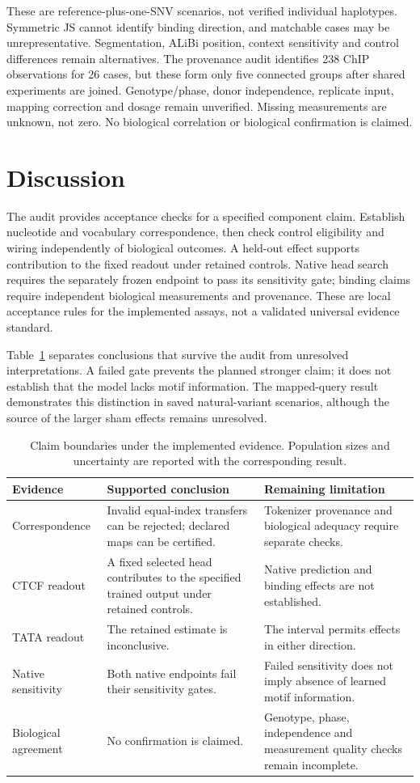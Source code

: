 \documentclass[unnumsec,webpdf,modern,large,namedate]{oup-authoring-template}
\begin{document}
These are reference-plus-one-SNV scenarios, not verified individual haplotypes. Symmetric JS cannot identify binding direction, and matchable cases may be unrepresentative. Segmentation, ALiBi position, context sensitivity and control differences remain alternatives. The provenance audit identifies 238 ChIP observations for 26 cases, but these form only five connected groups after shared experiments are joined. Genotype/phase, donor independence, replicate input, mapping correction and dosage remain unverified. Missing measurements are unknown, not zero. No biological correlation or biological confirmation is claimed.
\section{Discussion}
The audit provides acceptance checks for a specified component claim. Establish nucleotide and vocabulary correspondence, then check control eligibility and wiring independently of biological outcomes. A held-out effect supports contribution to the fixed readout under retained controls. Native head search requires the separately frozen endpoint to pass its sensitivity gate; binding claims require independent biological measurements and provenance. These are local acceptance rules for the implemented assays, not a validated universal evidence standard.

Table~\ref{tab:claims} separates conclusions that survive the audit from unresolved interpretations. A failed gate prevents the planned stronger claim; it does not establish that the model lacks motif information. The mapped-query result demonstrates this distinction in saved natural-variant scenarios, although the source of the larger sham effects remains unresolved.
\begin{table}[h]\centering\small
\caption{Claim boundaries under the implemented evidence. Population sizes and uncertainty are reported with the corresponding result.}\label{tab:claims}
\begin{tabular}{p{.20\linewidth}p{.33\linewidth}p{.36\linewidth}}\toprule
Evidence & Supported conclusion & Remaining limitation \\\midrule
Correspondence & Invalid equal-index transfers can be rejected; declared maps can be certified. & Tokenizer provenance and biological adequacy require separate checks. \\
CTCF readout & A fixed selected head contributes to the specified trained output under retained controls. & Native prediction and binding effects are not established. \\
TATA readout & The retained estimate is inconclusive. & The interval permits effects in either direction. \\
Native sensitivity & Both native endpoints fail their sensitivity gates. & Failed sensitivity does not imply absence of learned motif information. \\
Biological agreement & No confirmation is claimed. & Genotype, phase, independence and measurement quality checks remain incomplete. \\\bottomrule
\end{tabular}\end{table}
\end{document}
